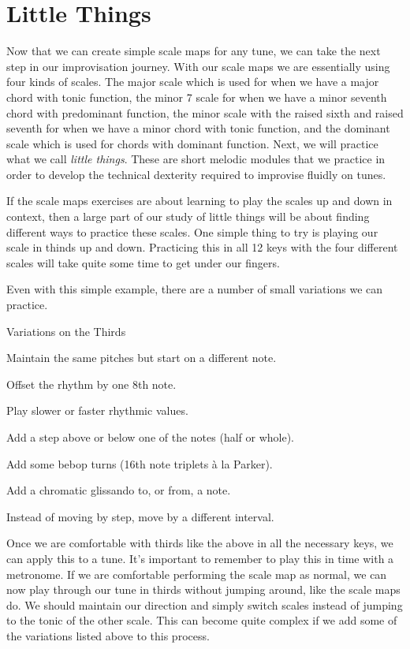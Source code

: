 \section{Little Things}

Now that we can create simple scale maps for any tune, we can take the next step in our improvisation journey. With our scale maps we are essentially using four kinds of scales. The major scale which is used for when we have a major chord with tonic function, the minor 7 scale for when we have a minor seventh chord with predominant function, the minor scale with the raised sixth and raised seventh for when we have a minor chord with tonic function, and the dominant scale which is used for chords with dominant function. Next, we will practice what we call \emph{little things}. These are short melodic modules that we practice in order to develop the technical dexterity required to improvise fluidly on tunes.

If the scale maps exercises are about learning to play the scales up and down in context, then a large part of our study of little things will be about finding different ways to practice these scales. One simple thing to try is playing our scale in thinds up and down. Practicing this in all 12 keys with the four different scales will take quite some time to get under our fingers.


Even with this simple example, there are a number of small variations we can practice.

\begin{bookStyledBulletList}{Variations on the Thirds}
	\item Maintain the same pitches but start on a different note.
	\item Offset the rhythm by one 8th note.
	\item Play slower or faster rhythmic values.
	\item Add a step above or below one of the notes (half or whole).
	\item Add some bebop turns (16th note triplets \`{a} la Parker).
	\item Add a chromatic glissando to, or from, a note.
	\item Instead of moving by step, move by a different interval.
\end{bookStyledBulletList}

Once we are comfortable with thirds like the above in all the necessary keys, we can apply this to a tune. It's important to remember to play this in time with a metronome. If we are comfortable performing the scale map as normal, we can now play through our tune in thirds  without jumping around, like the scale maps do. We should maintain our direction and simply switch scales instead of jumping to the tonic of the other scale. This can become quite complex if we add some of the variations listed above to this process.

